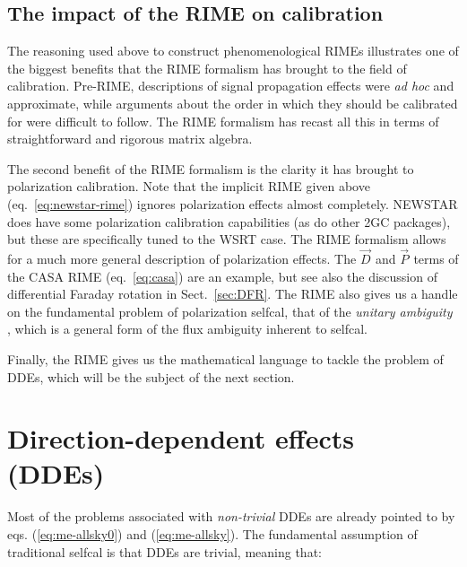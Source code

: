 \documentclass[]{aa}
\newcommand{\jones}[2]{\vec {#1}_{#2}}
\begin{document}
\subsection{The impact of the RIME on calibration}

The reasoning used above to construct phenomenological RIMEs illustrates one of the biggest benefits that the RIME formalism has brought to the field of calibration. Pre-RIME, descriptions of signal propagation effects were \emph{ad hoc} and approximate, while arguments about the order in which they should be calibrated for were difficult to follow. The RIME formalism has recast all this in terms of straightforward and rigorous matrix algebra.

The second benefit of the RIME formalism is the clarity it has brought to polarization calibration. Note that the implicit RIME given above (eq.~\ref{eq:newstar-rime}) ignores polarization effects almost completely. NEWSTAR does have some polarization calibration capabilities (as do other 2GC packages), but these are specifically tuned to the WSRT case. The RIME formalism allows for a much more general description of polarization effects. The $\jones{D}{}$ and $\jones{P}{}$ terms of the CASA RIME (eq.~\ref{eq:casa}) are an example, but see also the discussion of differential Faraday rotation in Sect.~\ref{sec:DFR}. The RIME also gives us a handle on the fundamental problem of polarization selfcal, that of the \emph{unitary ambiguity} \citep{ME4,ME5}, which is a general form of the flux ambiguity inherent to selfcal. 

Finally, the RIME gives us the mathematical language to tackle the problem of DDEs, which will be the subject of the next section.


\section{\label{sec:ddes}Direction-dependent effects (DDEs)}

Most of the problems associated with \emph{non-trivial} DDEs are already pointed to by eqs. (\ref{eq:me-allsky0}) and (\ref{eq:me-allsky}). The fundamental assumption of traditional selfcal is that DDEs are trivial, meaning that:
\end{document}
